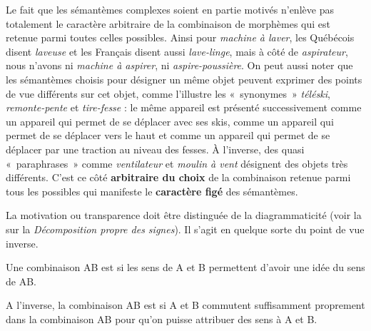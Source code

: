Le fait que les sémantèmes complexes soient en partie motivés n’enlève pas totalement le caractère arbitraire de la combinaison de morphèmes qui est retenue parmi toutes celles possibles. Ainsi pour \textit{machine à laver}, les Québécois disent \textit{laveuse} et les Français disent aussi \textit{lave-linge}, mais à côté de \textit{aspirateur}, nous n’avons ni \textit{machine à aspirer}, ni \textit{aspire-poussière}. On peut aussi noter que les sémantèmes choisis pour désigner un même objet peuvent exprimer des points de vue différents sur cet objet, comme l’illustre les «~synonymes~» \textit{téléski}, \textit{remonte-pente} et \textit{tire-fesse} : le même appareil est présenté successivement comme un appareil qui permet de se déplacer avec ses skis, comme un appareil qui permet de se déplacer vers le haut et comme un appareil qui permet de se déplacer par une traction au niveau des fesses. À l’inverse, des quasi «~paraphrases~» comme \textit{ventilateur} et \textit{moulin à vent} désignent des objets très différents. C’est ce côté \textbf{arbitraire du choix} de la combinaison retenue parmi tous les possibles qui manifeste le \textbf{caractère figé} des sémantèmes.

La motivation ou transparence doit être distinguée de la diagrammaticité (voir la  sur la \textit{Décomposition propre des signes}). Il s’agit en quelque sorte du point de vue inverse.

{Une combinaison AB est  si les sens de A et B permettent d’avoir une idée du sens de AB.}

{A l’inverse, la combinaison AB est  si A et B commutent suffisamment proprement dans la combinaison AB pour qu’on puisse attribuer des sens à A et B.}

